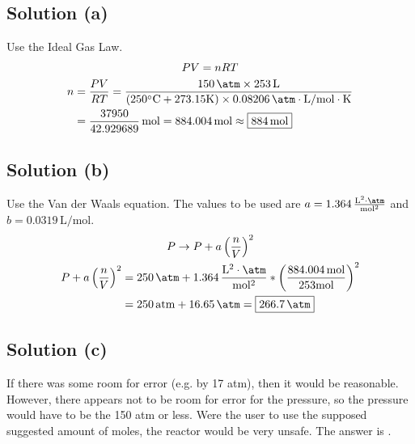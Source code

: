 \documentclass[10pt]{article}
\begin{document}
        \subsection{Solution (a)}
            Use the Ideal Gas Law. 
            \begin{gather}
                PV  =   nRT\\
                \begin{align}
                    n   &=  \frac{PV}{RT}
                        =   \frac{150\,\unit{\atm} \times 253\,\unit{\liter}}{(250\unit{\celsius} + 273.15\unit{\kelvin}) \times 0.08206\,\unit{\atm\cdot\liter/\mol\cdot\kelvin}}\\
                        &=  \frac{37950}{42.929689}\,\unit{\mole}
                        =   884.004\,\unit{\mole}
                        \approx \boxed{884\,\unit{\mole}}
                \end{align}
            \end{gather}

        \subsection{Solution (b)}
            Use the Van der Waals equation. 
            The values to be used are $a = 1.364\,\unit{\frac{L^2\cdot\atm}{\mole^2}}$ and $b = 0.0319\,\unit{\liter/\mole}$. 
            \begin{gather}
                P \to P + a \left( \frac{n}{V} \right)^2\\
                \begin{align}
                    P + a \left( \frac{n}{V} \right)^2  &=  250\,\unit{\atm} + 1.364\,\unit{\frac{L^2\cdot\atm}{\mole^2}} * \left( \frac{884.004\,\unit{\mole}}{253\unit{\mole}} \right)^2\\
                        &=  250\,\unit{atm} + 16.65\,\unit{\atm}
                        =   \boxed{266.7\,\unit{\atm}}
                \end{align}
            \end{gather}

        \subsection{Solution (c)}
            If there was some room for error (e.g. by 17 atm), then it would be reasonable. 
            However, there appears not to be room for error for the pressure, so the pressure would have to be the 150 atm or less.
            Were the user to use the supposed suggested amount of moles, the reactor would be very unsafe.
            The answer is . 
\end{document}
